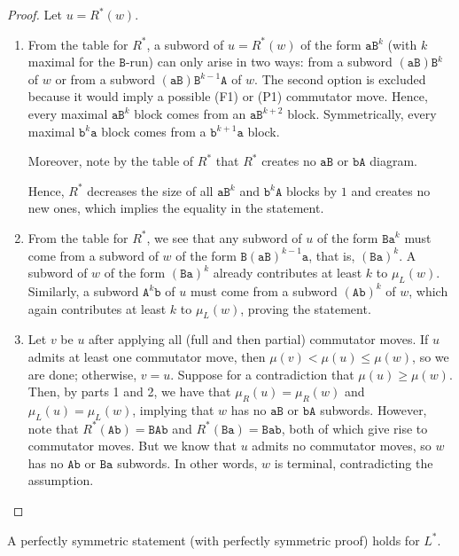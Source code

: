 \documentclass{article}
\begin{document}
	\begin{proof}
		Let $u=R^*(w)$.
		\begin{enumerate}
			\item From the table for $R^*$, a subword of $u=R^*(w)$ of the form $\mathtt{aB}^k$ (with $k$ maximal for the $\mathtt{B}$-run) can only arise in two ways: from a subword $(\mathtt{aB})\mathtt{B}^k$ of $w$ or from a subword $(\mathtt{aB})\mathtt{B}^{k-1}\mathtt{A}$ of $w$. The second option is excluded because it would imply a possible (F1) or (P1) commutator move. Hence, every maximal $\mathtt{aB}^k$ block comes from an $\mathtt{aB}^{k+2}$ block. Symmetrically, every maximal $\mathtt{b}^k\mathtt{a}$ block comes from a $\mathtt{b}^{k+1}\mathtt{a}$ block. 
			
			Moreover, note by the table of $R^*$ that $R^*$ creates no $\mathtt{aB}$ or $\mathtt{bA}$ diagram.
			
			Hence, $R^*$ decreases the size of all $\mathtt{aB}^k$ and $\mathtt{b}^k\mathtt{A}$ blocks by $1$ and creates no new ones, which implies the equality in the statement.
			
			\item From the table for $R^*$, we see that any subword of $u$ of the form $\mathtt{B a}^k$ must come from a subword of $w$ of the form $\mathtt{B}(\mathtt{aB})^{k-1}\mathtt{a}$, that is, $(\mathtt{B a})^k$.
			A subword of $w$ of the form $(\mathtt{B a})^k$ already contributes at least $k$ to $\mu_L(w)$.
			Similarly, a subword $\mathtt{A}^k \mathtt{b}$ of $u$ must come from a subword $(\mathtt{A b})^k$ of $w$, which again contributes at least $k$ to $\mu_L(w)$, proving the statement.
			\item Let $v$ be $u$ after applying all (full and then partial) commutator moves.
			If $u$ admits at least one commutator move, then $\mu(v)<\mu(u)\le\mu(w)$, so we are done; otherwise, $v=u$.
			Suppose for a contradiction that $\mu(u)\ge\mu(w)$.
			Then, by parts 1 and 2, we have that $\mu_R(u)=\mu_R(w)$ and $\mu_L(u)=\mu_L(w)$, implying that $w$ has no $\mathtt{aB}$ or $\mathtt{bA}$ subwords.
			However, note that $R^*(\mathtt{A b})=\mathtt{BAb} $ and $R^*(\mathtt{B a})=\mathtt{B ab}$, both of which give rise to commutator moves.
			But we know that $u$ admits no commutator moves, so $w$ has no $\mathtt{A b}$ or $\mathtt{B a}$ subwords.
			In other words, $w$ is terminal, contradicting the assumption. 
		\end{enumerate}
	\end{proof}
	
	A perfectly symmetric statement (with perfectly symmetric proof) holds for $L^*$.
	
\end{document}
